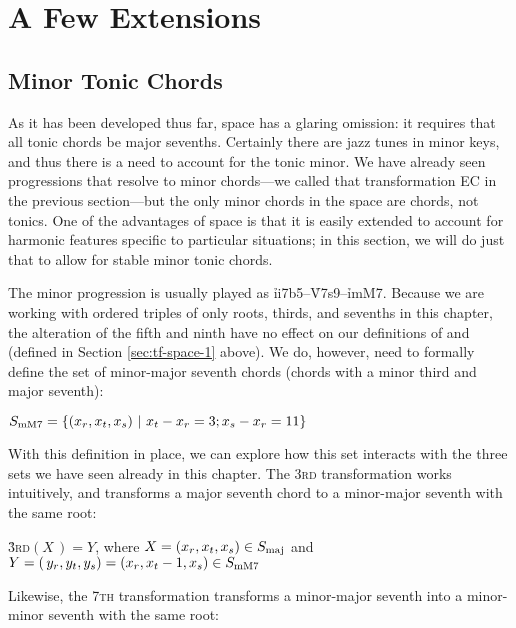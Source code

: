 
\section{A Few Extensions}
\label{sec:tf-extensions}

\subsection{Minor Tonic Chords}

As it has been developed thus far, \tf space has a glaring omission: it
requires that all tonic chords be major sevenths. Certainly there are jazz
tunes in minor keys, and thus there is a need to account for the tonic minor.
We have already seen \tf progressions that resolve to minor chords---we called
that transformation EC in the previous section---but the only minor chords in
the space are \ii chords, not tonics. One of the advantages of \tf space is
that it is easily extended to account for harmonic features specific to
particular situations; in this section, we will do just that to allow for
stable minor tonic chords.

The minor \tfmo progression is usually played as
\mbox{\h{ii7b5}--\h{V7s9}--\h{i\thinspace{}mM7}}. Because
we are working with ordered triples of only roots, thirds, and sevenths in
this chapter, the alteration of the fifth and ninth have no effect on our
definitions of \Smin and \Sdom (defined in Section \ref{sec:tf-space-1}
above). We do, however, need to formally define the set of minor-major seventh
chords (chords with a minor third and major seventh):

\vspace{.5\baselineskip}
  $S_{\mathrm{mM7}} = \{ (x_r, x_t, x_s)\ |\ x_t - x_r = 3; x_s - x_r = 11 \}$
\vspace{.5\baselineskip}

With this definition in place, we can explore how this set interacts with the
three sets we have seen already in this chapter. The \textsc{3rd}
transformation works intuitively, and transforms a major seventh chord to a
minor-major seventh with the same root:

\vspace{.5\baselineskip}
  \h{3}\textsc{rd}$(X\,) = Y$, where $X = (x_r, x_t, x_s) \in S_{\mathrm{maj}}$ and
  $Y=(\,y_r, y_t, y_s)=(x_r, x_t-1, x_s) \in S_{\mathrm{mM7}}$
\vspace{.5\baselineskip}

\noindent Likewise, the \textsc{7th} transformation transforms a
minor-major seventh into a minor-minor seventh with the same root:

